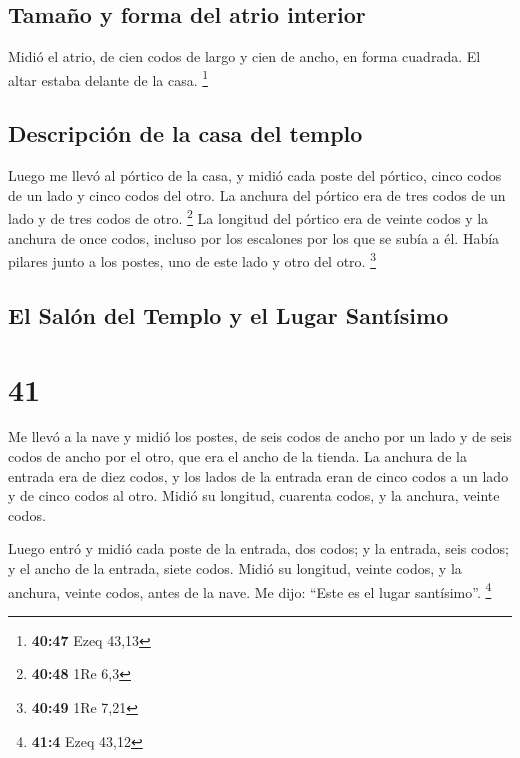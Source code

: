 \hypertarget{tamauxf1o-y-forma-del-atrio-interior}{%
\subsection{Tamaño y forma del atrio
interior}\label{tamauxf1o-y-forma-del-atrio-interior}}

 Midió el atrio, de cien codos de largo y cien de ancho,
en forma cuadrada. El altar estaba delante de la casa. \footnote{\textbf{40:47}
  Ezeq 43,13}

\hypertarget{descripciuxf3n-de-la-casa-del-templo}{%
\subsection{Descripción de la casa del
templo}\label{descripciuxf3n-de-la-casa-del-templo}}

 Luego me llevó al pórtico de la casa, y midió cada poste
del pórtico, cinco codos de un lado y cinco codos del otro. La anchura
del pórtico era de tres codos de un lado y de tres codos de otro.
\footnote{\textbf{40:48} 1Re 6,3}  La longitud del
pórtico era de veinte codos y la anchura de once codos, incluso por los
escalones por los que se subía a él. Había pilares junto a los postes,
uno de este lado y otro del otro. \footnote{\textbf{40:49} 1Re 7,21}

\hypertarget{el-saluxf3n-del-templo-y-el-lugar-santuxedsimo}{%
\subsection{El Salón del Templo y el Lugar
Santísimo}\label{el-saluxf3n-del-templo-y-el-lugar-santuxedsimo}}

\hypertarget{section-40}{%
\section{41}\label{section-40}}

 Me llevó a la nave y midió los postes, de seis codos de
ancho por un lado y de seis codos de ancho por el otro, que era el ancho
de la tienda.  La anchura de la entrada era de diez codos,
y los lados de la entrada eran de cinco codos a un lado y de cinco codos
al otro. Midió su longitud, cuarenta codos, y la anchura, veinte codos.

 Luego entró y midió cada poste de la entrada, dos codos;
y la entrada, seis codos; y el ancho de la entrada, siete codos.
 Midió su longitud, veinte codos, y la anchura, veinte
codos, antes de la nave. Me dijo: ``Este es el lugar santísimo''.
\footnote{\textbf{41:4} Ezeq 43,12}

